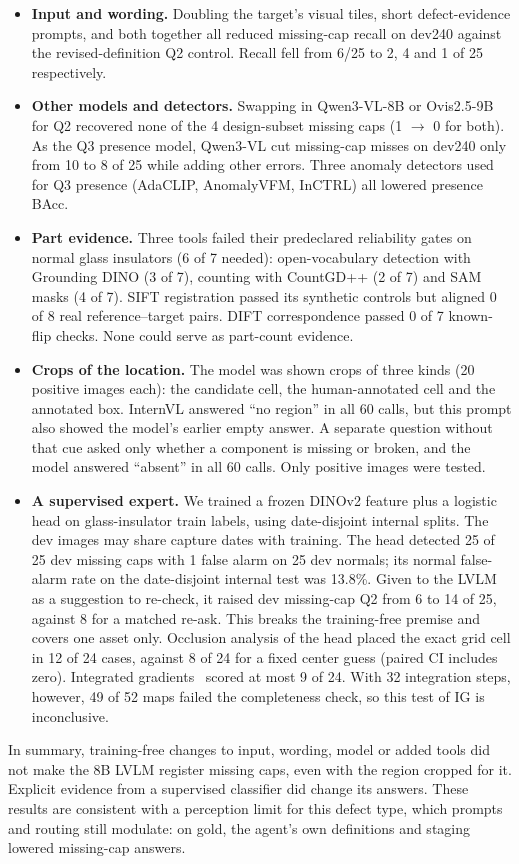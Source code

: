 \documentclass[11pt]{article}
\begin{document}
\begin{itemize}
  \item \textbf{Input and wording.} Doubling the target's visual tiles, short defect-evidence prompts, and both together all reduced missing-cap recall on dev240 against the revised-definition Q2 control. Recall fell from 6/25 to 2, 4 and 1 of 25 respectively.
  \item \textbf{Other models and detectors.} Swapping in Qwen3-VL-8B or Ovis2.5-9B for Q2 recovered none of the 4 design-subset missing caps (1 $\rightarrow$ 0 for both). As the Q3 presence model, Qwen3-VL cut missing-cap misses on dev240 only from 10 to 8 of 25 while adding other errors. Three anomaly detectors used for Q3 presence (AdaCLIP, AnomalyVFM, InCTRL) all lowered presence BAcc.
  \item \textbf{Part evidence.} Three tools failed their predeclared reliability gates on normal glass insulators (6 of 7 needed): open-vocabulary detection with Grounding DINO (3 of 7), counting with CountGD++ (2 of 7) and SAM masks (4 of 7). SIFT registration passed its synthetic controls but aligned 0 of 8 real reference--target pairs. DIFT correspondence passed 0 of 7 known-flip checks. None could serve as part-count evidence.
  \item \textbf{Crops of the location.} The model was shown crops of three kinds (20 positive images each): the candidate cell, the human-annotated cell and the annotated box. InternVL answered ``no region'' in all 60 calls, but this prompt also showed the model's earlier empty answer. A separate question without that cue asked only whether a component is missing or broken, and the model answered ``absent'' in all 60 calls. Only positive images were tested.
  \item \textbf{A supervised expert.} We trained a frozen DINOv2 feature plus a logistic head on glass-insulator train labels, using date-disjoint internal splits. The dev images may share capture dates with training. The head detected 25 of 25 dev missing caps with 1 false alarm on 25 dev normals; its normal false-alarm rate on the date-disjoint internal test was 13.8\%. Given to the LVLM as a suggestion to re-check, it raised dev missing-cap Q2 from 6 to 14 of 25, against 8 for a matched re-ask. This breaks the training-free premise and covers one asset only. Occlusion analysis of the head placed the exact grid cell in 12 of 24 cases, against 8 of 24 for a fixed center guess (paired CI includes zero). Integrated gradients~\cite{sundararajan2017ig} scored at most 9 of 24. With 32 integration steps, however, 49 of 52 maps failed the completeness check, so this test of IG is inconclusive.
\end{itemize}
In summary, training-free changes to input, wording, model or added tools did not make the 8B LVLM register missing caps, even with the region cropped for it. Explicit evidence from a supervised classifier did change its answers. These results are consistent with a perception limit for this defect type, which prompts and routing still modulate: on gold, the agent's own definitions and staging lowered missing-cap answers.
\end{document}
